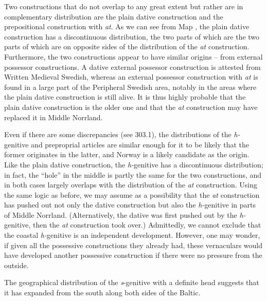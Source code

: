 \begin{styleBodytextC}
Two constructions that do not overlap to any great extent but rather are in complementary distribution are the plain dative construction and the prepositional construction with \textit{at}. As we can see from Map , the plain dative construction has a discontinuous distribution, the two parts of which are the two parts of which are on opposite sides of the distribution of the \textit{at} construction. Furthermore, the two constructions appear to have similar origins – from external possessor constructions. A dative external possessor construction is attested from Written Medieval Swedish, whereas an external possessor construction with \textit{at} is found in a large part of the Peripheral Swedish area, notably in the areas where the plain dative construction is still alive. It is thus highly probable that the plain dative construction is the older one and that the \textit{at} construction may have replaced it in Middle Norrland. 

\end{styleBodytextC}

\begin{styleBodytextC}
Even if there are some discrepancies (see 303.1), the distributions of the \textit{h-}genitive and preproprial articles are similar enough for it to be likely that the former originates in the latter, and Norway is a likely candidate as the origin. Like the plain dative construction, the \textit{h-}genitive has a discontinuous distribution; in fact, the “hole” in the middle is partly the same for the two constructions, and in both cases largely overlaps with the distribution of the \textit{at} construction. Using the same logic as before, we may assume as a possibility that the \textit{at} construction has pushed out not only the dative construction but also the \textit{h-}genitive in parts of Middle Norrland. (Alternatively, the dative was first pushed out by the \textit{h-}genitive, then the \textit{at }construction took over.) Admittedly, we cannot exclude that the coastal \textit{h-}genitive is an independent development. However, one may wonder, if given all the possessive constructions they already had, these vernaculars would have developed another possessive construction if there were no pressure from the outside.

\end{styleBodytextC}

\begin{styleBodytextC}
The geographical distribution of the \textit{s}{}-genitive with a definite head suggests that it has expanded from the south along both sides of the Baltic. 

\end{styleBodytextC}

